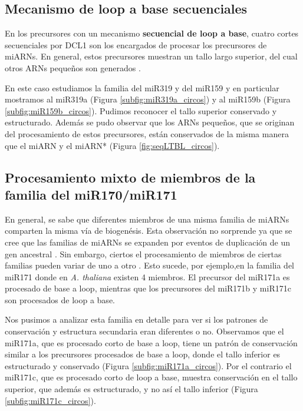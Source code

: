 \subsection{Mecanismo de loop a base secuenciales}

En los precursores con un mecanismo \textbf{secuencial de loop a base}, cuatro cortes secuenciales por DCL1 son los encargados de procesar los precursores de miARNs.
En general, estos precursores muestran un tallo largo superior, del cual otros ARNs pequeños son generados \citep{pmid19850910,Bologna2009,Bologna2013}.

En este caso estudiamos la familia del miR319 y del miR159 y en particular mostramos al miR319a (Figura \ref{subfig:miR319a_circos}) y al miR159b (Figura \ref{subfig:miR159b_circos}).
Pudimos reconocer el tallo superior conservado y estructurado.
Además se pudo observar que los ARNs pequeños, que se originan del procesamiento de estos precursores, están conservados de la misma manera que el miARN y el miARN* (Figura \ref{fig:seqLTBL_circos}).


\subsection{Procesamiento mixto de miembros de la familia del miR170/miR171}

En general, se sabe que diferentes miembros de una misma familia de miARNs comparten la misma vía de biogenésis. 
Esta observación no sorprende ya que se cree que las familias de miARNs se expanden por eventos de duplicación de un gen ancestral \citep{pmid15565108}.
Sin embargo, ciertos el procesamiento de miembros de ciertas familias pueden variar de uno a otro \citep{Bologna2013}.
Esto sucede, por ejemplo,en la familia del miR171 donde en \textit{A. thaliana} existen 4 miembros. 
El precursor del miR171a es procesado de base a loop, mientras que los precursores del miR171b y miR171c son procesados de loop a base.

Nos pusimos a analizar esta familia en detalle para ver si los patrones de conservación y estructura secundaria eran diferentes o no.
Observamos que el miR171a, que es procesado corto de base a loop, tiene un patrón de conservación similar a los precursores procesados de base a loop, donde el tallo inferior es estructurado y conservado (Figura \ref{subfig:miR171a_circos}).
Por el contrario el miR171c, que es procesado corto de loop a base, muestra conservación en el tallo superior, que además es estructurado, y no así el tallo inferior (Figura \ref{subfig:miR171c_circos}).



